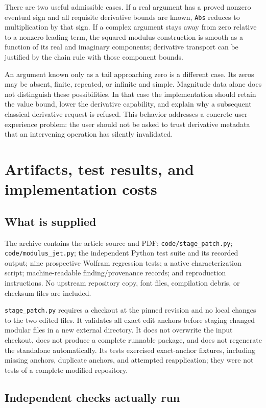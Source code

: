 \documentclass[11pt,a4paper]{article}
\newcommand{\code}[1]{\nolinkurl{#1}}
\begin{document}
There are two useful admissible cases. If a real argument has a proved nonzero eventual sign and all requisite derivative bounds are known, \code{Abs} reduces to multiplication by that sign. If a complex argument stays away from zero relative to a nonzero leading term, the squared-modulus construction is smooth as a function of its real and imaginary components; derivative transport can be justified by the chain rule with those component bounds.

An argument known only as a tail approaching zero is a different case. Its zeros may be absent, finite, repeated, or infinite and simple. Magnitude data alone does not distinguish these possibilities. In that case the implementation should retain the value bound, lower the derivative capability, and explain why a subsequent classical derivative request is refused. This behavior addresses a concrete user-experience problem: the user should not be asked to trust derivative metadata that an intervening operation has silently invalidated.

\section{Artifacts, test results, and implementation costs}
\subsection{What is supplied}

The archive contains the article source and PDF; \code{code/stage_patch.py}; \code{code/modulus_jet.py}; the independent Python test suite and its recorded output; nine prospective Wolfram regression tests; a native characterization script; machine-readable finding/provenance records; and reproduction instructions. No upstream repository copy, font files, compilation debris, or checksum files are included.

\code{stage_patch.py} requires a checkout at the pinned revision and no local changes to the two edited files. It validates all exact edit anchors before staging changed modular files in a new external directory. It does not overwrite the input checkout, does not produce a complete runnable package, and does not regenerate the standalone automatically. Its tests exercised exact-anchor fixtures, including missing anchors, duplicate anchors, and attempted reapplication; they were not tests of a complete modified repository.

\subsection{Independent checks actually run}
\end{document}
